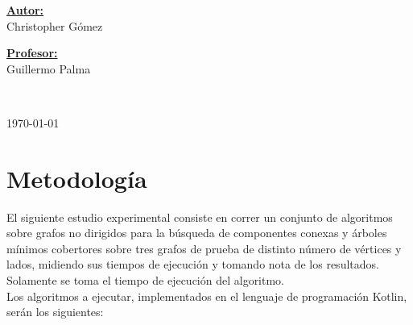 \documentclass[11pt]{article}
\begin{document}
\begin{center}
   \begin{minipage}{\textwidth} 
      \begin{flushleft} \large    
         \textbf{\underline{Autor:}} \\ 
         Christopher Gómez \\
      \end{flushleft}
   \end{minipage}

   \begin{minipage}{\textwidth}    
      \vspace{-0.6cm}  
      \begin{flushright} \large    
         \textbf{\underline{Profesor:}} \\  
         Guillermo Palma  
      \end{flushright}        
   \end{minipage} 

   \vspace*{1cm}
   \\
   \vspace{2cm}  

   \begin{center} 
      {\large \today} 
   \end{center}     
\end{center}                                                      
                                                               
\newpage
                                                    

\section{Metodología}

El siguiente estudio experimental consiste en correr un conjunto de algoritmos
sobre grafos no dirigidos para la búsqueda de componentes conexas y árboles mínimos
cobertores sobre tres grafos de prueba de distinto número de vértices y lados,
midiendo sus tiempos de ejecución y tomando nota de los resultados. \\

Solamente se toma el tiempo de ejecución del algoritmo. \\

Los algoritmos a ejecutar, implementados en el lenguaje de programación Kotlin,
serán los siguientes: 
\end{document}
